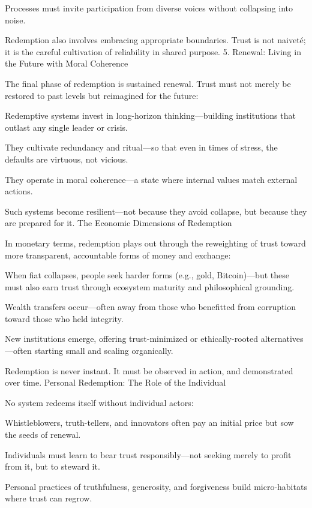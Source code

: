 \documentclass[11pt,oneside]{book}
\begin{document}
    Processes must invite participation from diverse voices without collapsing into noise.

Redemption also involves embracing appropriate boundaries. Trust is not naiveté; it is the careful cultivation of reliability in shared purpose.
5. Renewal: Living in the Future with Moral Coherence

The final phase of redemption is sustained renewal. Trust must not merely be restored to past levels but reimagined for the future:

    Redemptive systems invest in long-horizon thinking—building institutions that outlast any single leader or crisis.

    They cultivate redundancy and ritual—so that even in times of stress, the defaults are virtuous, not vicious.

    They operate in moral coherence—a state where internal values match external actions.

Such systems become resilient—not because they avoid collapse, but because they are prepared for it.
The Economic Dimensions of Redemption

In monetary terms, redemption plays out through the reweighting of trust toward more transparent, accountable forms of money and exchange:

    When fiat collapses, people seek harder forms (e.g., gold, Bitcoin)—but these must also earn trust through ecosystem maturity and philosophical grounding.

    Wealth transfers occur—often away from those who benefitted from corruption toward those who held integrity.

    New institutions emerge, offering trust-minimized or ethically-rooted alternatives—often starting small and scaling organically.

Redemption is never instant. It must be observed in action, and demonstrated over time.
Personal Redemption: The Role of the Individual

No system redeems itself without individual actors:

    Whistleblowers, truth-tellers, and innovators often pay an initial price but sow the seeds of renewal.

    Individuals must learn to bear trust responsibly—not seeking merely to profit from it, but to steward it.

    Personal practices of truthfulness, generosity, and forgiveness build micro-habitats where trust can regrow.
\end{document}
